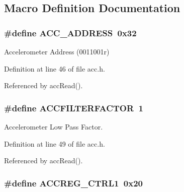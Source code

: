 \subsection{Macro Definition Documentation}
\hypertarget{group__acc_ga27341a8e1cb1a6ace5a5cf3caea1c99f}{
\subsubsection[{A\-C\-C\-\_\-\-A\-D\-D\-R\-E\-S\-S}]{\setlength{\rightskip}{0pt plus 5cm}\#define A\-C\-C\-\_\-\-A\-D\-D\-R\-E\-S\-S~0x32}}\label{group__acc_ga27341a8e1cb1a6ace5a5cf3caea1c99f}


Accelerometer Address (0011001r) 



Definition at line 46 of file acc.\-h.



Referenced by acc\-Read().

\hypertarget{group__acc_gaace41596724b03f3f2b2ee28b7e87272}{
\subsubsection[{A\-C\-C\-F\-I\-L\-T\-E\-R\-F\-A\-C\-T\-O\-R}]{\setlength{\rightskip}{0pt plus 5cm}\#define A\-C\-C\-F\-I\-L\-T\-E\-R\-F\-A\-C\-T\-O\-R~1}}\label{group__acc_gaace41596724b03f3f2b2ee28b7e87272}


Accelerometer Low Pass Factor. 



Definition at line 49 of file acc.\-h.



Referenced by acc\-Read().

\hypertarget{group__acc_gae81a43863d896c9afe65cc45bf8db9dc}{
\subsubsection[{A\-C\-C\-R\-E\-G\-\_\-\-C\-T\-R\-L1}]{\setlength{\rightskip}{0pt plus 5cm}\#define A\-C\-C\-R\-E\-G\-\_\-\-C\-T\-R\-L1~0x20}}\label{group__acc_gae81a43863d896c9afe65cc45bf8db9dc}


